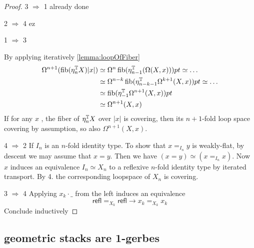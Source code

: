 \documentclass{article}
\newcommand{\refl}{\mathsf{refl}}
\begin{document}
\begin{proof}
	\item [3 $\Rightarrow$ 1] already done
	\item [2 $\Rightarrow$ 4] ez
	\item [1 $\Rightarrow$ 3]

	By applying iteratively \ref{lemma:loopOfFiber} 
	\begin{align*}
	\Omega^{n+1} (\operatorname{fib} (\eta_n^{\mathbb{T}} X) |x|) &\simeq \Omega^n \operatorname{fib} (\eta_{n-1}^{\mathbb{T}} (\Omega (X,x))) pt \simeq \hdots \\
	&\simeq \Omega^{n-k} \operatorname{fib}(\eta_{n-k-1}^{\mathbb{T}} \Omega^{k+1}(X,x)) pt \simeq \hdots \\
	&\simeq \operatorname{fib} (\eta_{-1}^{\mathbb{T}} \Omega^{n+1} (X,x)) pt \\
	&\simeq \Omega^{n+1} (X , x)
	\end{align*}
	If for any $x$ , the fiber of $\eta_n^{\mathbb{T}} X$ over $|x|$ is covering, then its $n+1$-fold loop space covering by assumption, so also $\Omega^{n+1} (X , x)$.	
	\item [4 $\Rightarrow$ 2] If $I_n$ is an $n$-fold identity type. To show that $x =_{I_n} y$ is weakly-flat, by descent we may assume that $x = y$. Then we have $(x = y) \simeq (x =_{I_n} x)$. Now $x$ induces an equivalence $I_n \simeq X_n$ to a reflexive $n$-fold identity type by iterated transport. By 4. the corresponding loopspace of $X_n$ is covering.
	\item [3 $\Rightarrow$ 4] Applying $x_k \cdot \_$ from the left induces an equivalence
	\[\refl =_{X_k} \refl \to x_k =_{X_k} x_k \]
	Conclude inductively
\end{proof}

\subsection{geometric stacks are 1-gerbes}
\end{document}
